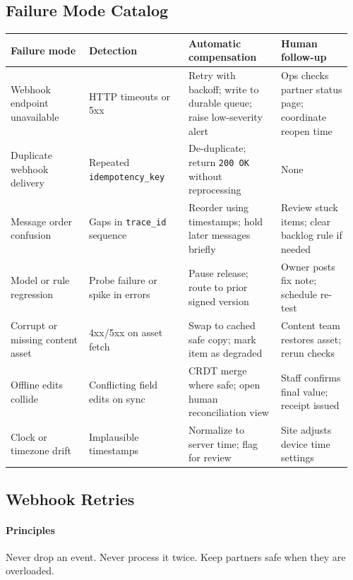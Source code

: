 \documentclass[12pt]{article}
\begin{document}
\subsection*{Failure Mode Catalog}
\begin{longtable}{@{}p{0.22\linewidth}p{0.28\linewidth}p{0.26\linewidth}p{0.20\linewidth}@{}}
\toprule
\textbf{Failure mode} & \textbf{Detection} & \textbf{Automatic compensation} & \textbf{Human follow-up} \\
\midrule
\endhead
Webhook endpoint unavailable & HTTP timeouts or 5xx & Retry with backoff; write to durable queue; raise low-severity alert & Ops checks partner status page; coordinate reopen time \\
Duplicate webhook delivery & Repeated \texttt{idempotency\_key} & De-duplicate; return \texttt{200 OK} without reprocessing & None \\
Message order confusion & Gaps in \texttt{trace\_id} sequence & Reorder using timestamps; hold later messages briefly & Review stuck items; clear backlog rule if needed \\
Model or rule regression & Probe failure or spike in errors & Pause release; route to prior signed version & Owner posts fix note; schedule re-test \\
Corrupt or missing content asset & 4xx/5xx on asset fetch & Swap to cached safe copy; mark item as degraded & Content team restores asset; rerun checks \\
Offline edits collide & Conflicting field edits on sync & CRDT merge where safe; open human reconciliation view & Staff confirms final value; receipt issued \\
Clock or timezone drift & Implausible timestamps & Normalize to server time; flag for review & Site adjusts device time settings \\
\bottomrule
\end{longtable}

\subsection*{Webhook Retries}
\paragraph{Principles}
Never drop an event. Never process it twice. Keep partners safe when they are overloaded.
\end{document}

